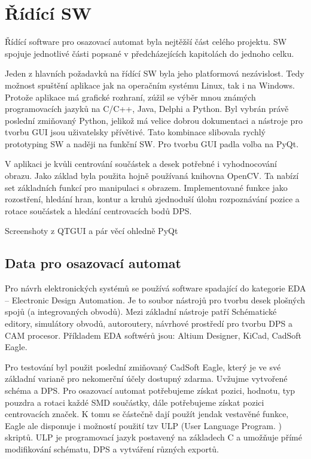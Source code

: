 \chapter{Řídící SW}

Řídící software pro osazovací automat byla nejtěžší část celého projektu. SW spojuje jednotlivé části popsané v předcházejících kapitolách do jednoho celku. 



Jeden z hlavních požadavků na řídící SW byla jeho platformová nezávislost. Tedy možnost spuštění aplikace jak na operačním systému Linux, tak i na Windows. Protože aplikace má grafické rozhraní, zúžil se výběr mnou známých programovacích jazyků na C/C++, Java, Delphi a Python. Byl vybrán  právě poslední zmiňovaný Python, jelikož má velice dobrou dokumentaci a nástroje pro tvorbu GUI jsou uživatelsky přívětivé.
Tato kombinace slibovala rychlý prototyping SW a naději na funkční SW. Pro tvorbu GUI padla volba na PyQt.

V aplikaci je kvůli centrování součástek a desek potřebné i vyhodnocování obrazu. Jako základ byla použita hojně používaná knihovna OpenCV. Ta nabízí set základních funkcí pro manipulaci s obrazem. Implementované funkce jako rozostření, hledání hran, kontur a kruhů zjednoduší úlohu rozpoznávání pozice a rotace součástek a hledání centrovacích bodů DPS.


Screenshoty z QTGUI a pár věcí ohledně PyQt







\section{Data pro osazovací automat}

Pro návrh elektronických systémů se používá software spadající do kategorie EDA – Electronic Design Automation. Je to soubor nástrojů pro tvorbu desek plošných spojů (a integrovaných obvodů). Mezi základní nástroje patří Schématické editory, simulátory obvodů, autoroutery, návrhové prostředí pro tvorbu DPS a CAM procesor. 
Příkladem EDA softwérů jsou: Altium Designer, KiCad, CadSoft Eagle.

Pro testování byl použit poslední zmiňovaný CadSoft Eagle, který je ve své základní varianě pro nekomerční účely dostupný zdarma. Uvžujme vytvořené schéma a DPS. Pro osazovací automat potřebujeme získat pozici, hodnotu, typ pouzdra a rotaci každé SMD součástky, dále potřebujeme získat pozici centrovacích značek. K tomu se částečně dají použít jendak vestavěné funkce, Eagle ale disponuje i možností použití tzv ULP (User Language Program. ) skriptů. ULP je programovací jazyk postavený na základech C a umožňuje přímé modifikování schématu, DPS a vytváření různých exportů.


